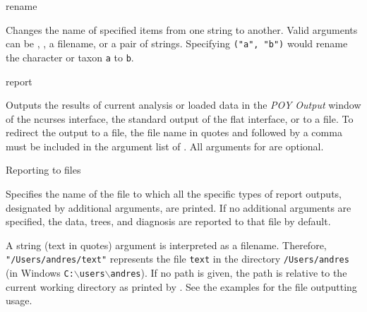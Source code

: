 \begin{command}{rename}{}


	\begin{poydescription} 
        Changes the name of specified items from one string to another. Valid
         arguments can be ,
        , a filename, or a pair of strings. Specifying \texttt{("a",
        "b")} would rename the character or taxon \texttt{a} to \texttt{b}.
	\end{poydescription}

\end{command}
        
\begin{command}{report}{}

	\syntax{\obligatory{(\optional{argument})}}

	\begin{poydescription} 
        Outputs the results of current analysis or loaded data in the \emph{POY Output}
        window of the ncurses interface, the standard output of the flat
        interface, or to a file. To redirect the output to a file, the file name in 
        quotes and followed by a comma must be included in the argument list
        of . All arguments for  are
        optional. 
	\end{poydescription}

	\begin{arguments}

        \begin{argumentgroup}{Reporting to files}{}

                {Specifies the name of the file to which all the specific types of report outputs,
                designated by additional arguments, are printed. If no additional arguments
                are specified, the data, trees, and diagnosis are reported to that file by
                default.
                
                A string (text in quotes) argument is interpreted as a filename.
                Therefore, \texttt{"/Users/andres/text"} represents the file \texttt{text} in
                the directory \texttt{/Users/andres} (in Windows
                \texttt{C:$\backslash$users$\backslash$andres}). If no path is given, the path
                is relative to the current working directory as printed by
                . See the examples for the file outputting
                usage.} 
                {}
        \end{argumentgroup}
                

\end{arguments}
\end{command}

